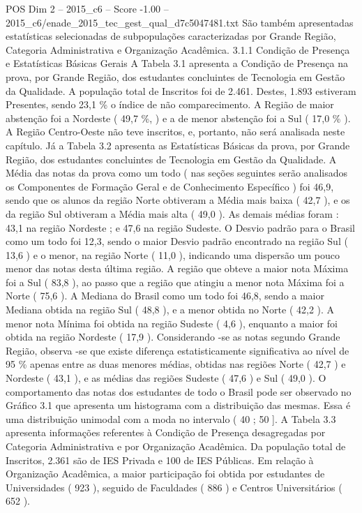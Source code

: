 \begin{textsample}{POS Dim 2 – 2015\_c6 – Score -1.00 – 2015\_c6/enade\_2015\_tec\_gest\_qual\_d7c5047481.txt}
São também apresentadas estatísticas selecionadas de subpopulações caracterizadas por Grande Região, Categoria Administrativa e Organização Acadêmica. 3.1.1 Condição de Presença e Estatísticas Básicas Gerais A Tabela 3.1 apresenta a Condição de Presença na prova, por Grande Região, dos estudantes concluintes de Tecnologia em Gestão da Qualidade.
A população total de Inscritos foi de 2.461.
Destes, 1.893 estiveram Presentes, sendo 23,1 \% o índice de não comparecimento.
A Região de maior abstenção foi a Nordeste ( 49,7 \%, ) e a de menor abstenção foi a Sul ( 17,0 \% ).
A Região Centro-Oeste não teve inscritos, e, portanto, não será analisada neste capítulo.
Já a Tabela 3.2 apresenta as Estatísticas Básicas da prova, por Grande Região, dos estudantes concluintes de Tecnologia em Gestão da Qualidade.
A Média das notas da prova como um todo ( nas seções seguintes serão analisados os Componentes de Formação Geral e de Conhecimento Específico ) foi 46,9, sendo que os alunos da região Norte obtiveram a Média mais baixa ( 42,7 ), e os da região Sul obtiveram a Média mais alta ( 49,0 ).
As demais médias foram : 43,1 na região Nordeste ; e 47,6 na região Sudeste.
O Desvio padrão para o Brasil como um todo foi 12,3, sendo o maior Desvio padrão encontrado na região Sul ( 13,6 ) e o menor, na região Norte ( 11,0 ), indicando uma dispersão um pouco menor das notas desta última região.
A região que obteve a maior nota Máxima foi a Sul ( 83,8 ), ao passo que a região que atingiu a menor nota Máxima foi a Norte ( 75,6 ).
A Mediana do Brasil como um todo foi 46,8, sendo a maior Mediana obtida na região Sul ( 48,8 ), e a menor obtida no Norte ( 42,2 ).
A menor nota Mínima foi obtida na região Sudeste ( 4,6 ), enquanto a maior foi obtida na região Nordeste ( 17,9 ).
Considerando -se as notas segundo Grande Região, observa -se que existe diferença estatisticamente significativa ao nível de 95 \% apenas entre as duas menores médias, obtidas nas regiões Norte ( 42,7 ) e Nordeste ( 43,1 ), e as médias das regiões Sudeste ( 47,6 ) e Sul ( 49,0 ).
O comportamento das notas dos estudantes de todo o Brasil pode ser observado no Gráfico 3.1 que apresenta um histograma com a distribuição das mesmas.
Essa é uma distribuição unimodal com a moda no intervalo ( 40 ; 50 ].
A Tabela 3.3 apresenta informações referentes à Condição de Presença desagregadas por Categoria Administrativa e por Organização Acadêmica.
Da população total de Inscritos, 2.361 são de IES Privada e 100 de IES Públicas.
Em relação à Organização Acadêmica, a maior participação foi obtida por estudantes de Universidades ( 923 ), seguido de Faculdades ( 886 ) e Centros Universitários ( 652 ).

\end{textsample}
